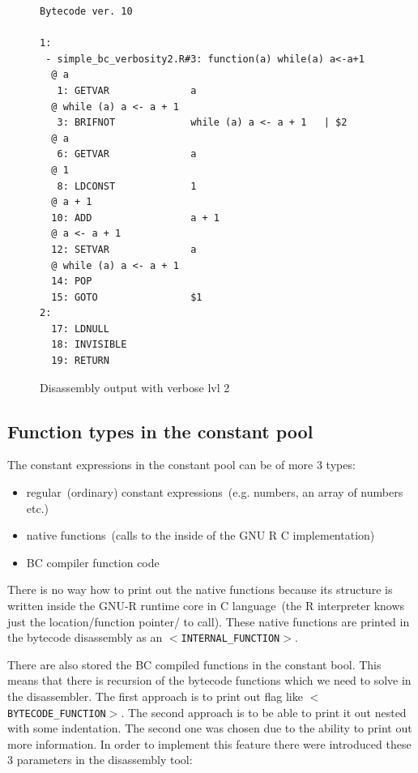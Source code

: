 \documentclass[thesis=M,english]{FITthesis}[2018/10/20]
\newcommand{\code}[1]{\texttt{#1}}
\begin{document}
\begin{figure}[h]
\begin{lstlisting}
Bytecode ver. 10

1:
 - simple_bc_verbosity2.R#3: function(a) while(a) a<-a+1
  @ a
   1: GETVAR              a
  @ while (a) a <- a + 1
   3: BRIFNOT             while (a) a <- a + 1	 | $2
  @ a
   6: GETVAR              a
  @ 1
   8: LDCONST             1
  @ a + 1
  10: ADD                 a + 1
  @ a <- a + 1
  12: SETVAR              a
  @ while (a) a <- a + 1
  14: POP
  15: GOTO                $1
2:
  17: LDNULL
  18: INVISIBLE
  19: RETURN
\end{lstlisting}
	\caption{Disassembly output with verbose lvl 2}\label{fig:disassembly-verbose-2}
\end{figure}


\subsection{Function types in the constant pool}

The constant expressions in the constant pool can be of more 3 types:

\begin{itemize}
	\item regular~(ordinary) constant expressions~(e.g. numbers, an array of numbers etc.)
	\item native functions~(calls to the inside of the GNU R C implementation)
	\item BC compiler function code
\end{itemize}

There is no way how to print out the native functions because its structure is written inside the GNU-R runtime core in C language~(the R interpreter knows just the location/function pointer/ to call). These native functions are printed in the bytecode disassembly as an \code{$<$INTERNAL{\_}FUNCTION$>$}.

There are also stored the BC compiled functions in the constant bool. This means that there is recursion of the bytecode functions which we need to solve in the disassembler. The first approach is to print out flag like \code{$<$BYTECODE{\_}FUNCTION$>$}. The second approach is to be able to print it out nested with some indentation. The second one was chosen due to the ability to print out more information. In order to implement this feature there were introduced these 3 parameters in the disassembly tool:
\end{document}
